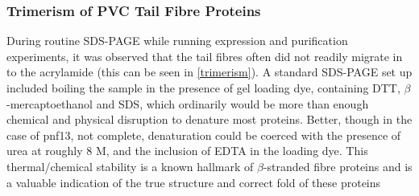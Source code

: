 \subsubsection{Trimerism of PVC Tail Fibre Proteins}
During routine SDS-PAGE while running expression and purification experiments, it was observed that the tail fibres often did not readily migrate in to the acrylamide (this can be seen in \vref{trimerism}). A standard SDS-PAGE set up included boiling the sample in the presence of gel loading dye, containing DTT, $\beta$-mercaptoethanol and SDS, which ordinarily would be more than enough chemical and physical disruption to denature most proteins. Better, though in the case of pnf13, not complete, denaturation could be coerced with the presence of urea at roughly 8 M, and the inclusion of EDTA in the loading dye. This thermal/chemical stability is a known hallmark of $\beta$-stranded fibre proteins and is a valuable indication of the true structure and correct fold of these proteins \citep{Papanikolopoulou2008, Gazit2008}

